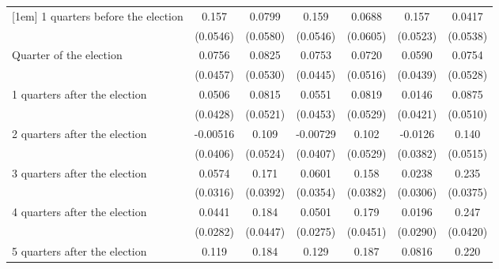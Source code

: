 \begin{table}[htbp]
\begin{tabular}{l*{6}{c}}
[1em]
 1 quarters before the election&       0.157\sym{**} &      0.0799         &       0.159\sym{**} &      0.0688         &       0.157\sym{**} &      0.0417         \\
                    &    (0.0546)         &    (0.0580)         &    (0.0546)         &    (0.0605)         &    (0.0523)         &    (0.0538)         \\
[1em]
Quarter of the election&      0.0756         &      0.0825         &      0.0753         &      0.0720         &      0.0590         &      0.0754         \\
                    &    (0.0457)         &    (0.0530)         &    (0.0445)         &    (0.0516)         &    (0.0439)         &    (0.0528)         \\
[1em]
 1 quarters after the election&      0.0506         &      0.0815         &      0.0551         &      0.0819         &      0.0146         &      0.0875         \\
                    &    (0.0428)         &    (0.0521)         &    (0.0453)         &    (0.0529)         &    (0.0421)         &    (0.0510)         \\
[1em]
 2 quarters after the election&    -0.00516         &       0.109\sym{*}  &    -0.00729         &       0.102         &     -0.0126         &       0.140\sym{**} \\
                    &    (0.0406)         &    (0.0524)         &    (0.0407)         &    (0.0529)         &    (0.0382)         &    (0.0515)         \\
[1em]
 3 quarters after the election&      0.0574         &       0.171\sym{***}&      0.0601         &       0.158\sym{***}&      0.0238         &       0.235\sym{***}\\
                    &    (0.0316)         &    (0.0392)         &    (0.0354)         &    (0.0382)         &    (0.0306)         &    (0.0375)         \\
[1em]
 4 quarters after the election&      0.0441         &       0.184\sym{***}&      0.0501         &       0.179\sym{***}&      0.0196         &       0.247\sym{***}\\
                    &    (0.0282)         &    (0.0447)         &    (0.0275)         &    (0.0451)         &    (0.0290)         &    (0.0420)         \\
[1em]
 5 quarters after the election&       0.119\sym{**} &       0.184\sym{***}&       0.129\sym{***}&       0.187\sym{***}&      0.0816\sym{*}  &       0.220\sym{***}\\

\end{tabular}
\end{table}
